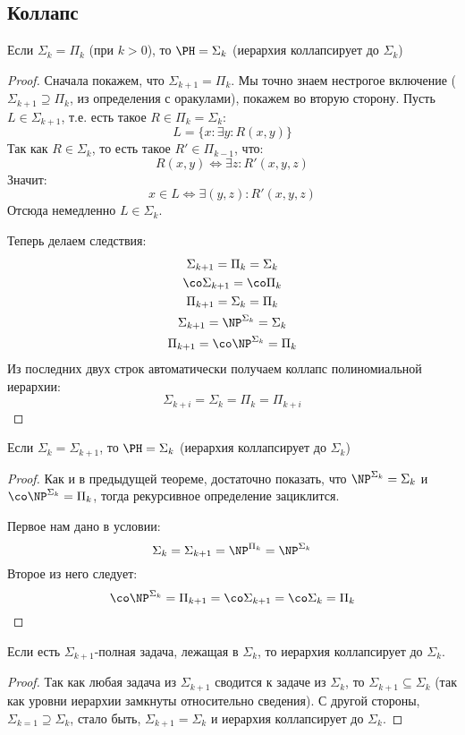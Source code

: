 \subsection{Коллапс}
	\begin{theorem}
		Если $\Sigma_k=\Pi_k$ (при $k>0$), то $\PH=\Sigma_k$ (иерархия коллапсирует до $\Sigma_k$)
	\end{theorem}
	\begin{proof}
		Сначала покажем, что $\Sigma_{k+1} = \Pi_k$.
		Мы точно знаем нестрогое включение ($\Sigma_{k+1} \supseteq \Pi_k$, из определения с оракулами), покажем во вторую сторону.
		Пусть $L \in \Sigma_{k+1}$, т.е. есть такое $R \in \Pi_k=\Sigma_k$:
		\[ L = \{ x \colon \exists y \colon R(x, y) \} \]
		Так как $R \in \Sigma_k$, то есть такое $R' \in \Pi_{k-1}$, что:
		\[ R(x, y) \iff \exists z \colon R'(x, y, z) \]
		Значит:
		\[ x \in L \iff \exists (y, z) \colon R'(x, y, z) \]
		Отсюда немедленно $L \in \Sigma_k$.

		Теперь делаем следствия:
		\begin{gather*}
			\Sigma_{k+1} = \Pi_k = \Sigma_k \\
			\co\Sigma_{k+1} = \co\Pi_k \\
			\Pi_{k+1} = \Sigma_k = \Pi_k \\
			\Sigma_{k+1} = \NP^{\Sigma_k} = \Sigma_k \\
			\Pi_{k+1} = \co\NP^{\Sigma_k} = \Pi_k
		\end{gather*}
		Из последних двух строк автоматически получаем коллапс полиномиальной иерархии:
		\[ \Sigma_{k+i} = \Sigma_k = \Pi_k = \Pi_{k+i} \]
	\end{proof}

	\begin{theorem}
		Если $\Sigma_k=\Sigma_{k+1}$, то $\PH=\Sigma_k$ (иерархия коллапсирует до $\Sigma_{k}$)
	\end{theorem}
	\begin{proof}
		Как и в предыдущей теореме, достаточно показать, что $\NP^{\Sigma_k}=\Sigma_k$ и $\co\NP^{\Sigma_k}=\Pi_k$,
		тогда рекурсивное определение зациклится.

		Первое нам дано в условии:
		\[ \Sigma_k=\Sigma_{k+1}=\NP^{\Pi_k}=\NP^{\Sigma_k} \]
		Второе из него следует:
		\[
			\co\NP^{\Sigma_k} = \Pi_{k+1} = \co\Sigma_{k+1} = \co\Sigma_k = \Pi_k
		\]
	\end{proof}

	\begin{conseq}
		Если есть $\Sigma_{k+1}$-полная задача, лежащая в $\Sigma_k$, то иерархия коллапсирует до $\Sigma_k$.
	\end{conseq}
	\begin{proof}
		Так как любая задача из $\Sigma_{k+1}$ сводится к задаче из $\Sigma_k$, то $\Sigma_{k+1} \subseteq \Sigma_k$
		(так как уровни иерархии замкнуты относительно сведения).
		С другой стороны, $\Sigma_{k=1} \supseteq \Sigma_k$, стало быть, $\Sigma_{k+1} = \Sigma_k$ и иерархия коллапсирует до $\Sigma_k$.
	\end{proof}

